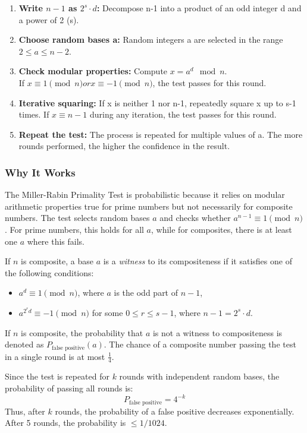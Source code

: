 \documentclass[12pt]{report}
\begin{document}
\begin{enumerate}
    \item \textbf{Write $n-1$ as $2^s \cdot d$:} Decompose n-1 into a product of an odd integer d and a power of 2 (s).
    \item \textbf{Choose random bases a:} Random integers a are selected in the range $2 \leq a \leq n-2$.
    \item \textbf{Check modular properties:} Compute $x = a^d \mod n$. \\ If $x \equiv 1 \pmod{n} or x \equiv -1 \pmod{n}$, the test passes for this round.
    \item \textbf{Iterative squaring:} If x is neither 1 nor n-1, repeatedly square x up to s-1 times. If $x \equiv n-1$ during any iteration, the test passes for this round.
    \item \textbf{Repeat the test:} The process is repeated for multiple values of a. The more rounds performed, the higher the confidence in the result.
\end{enumerate}

\subsubsection{Why It Works}

    The Miller-Rabin Primality Test is probabilistic because it relies on modular arithmetic properties true for prime numbers but not necessarily for composite numbers. The test selects random bases $a$ and checks whether $a^{n-1} \equiv 1 \pmod{n}$. For prime numbers, this holds for all $a$, while for composites, there is at least one $a$ where this fails.

    If $n$ is composite, a base $a$ is a \textit{witness} to its compositeness if it satisfies one of the following conditions: 
\begin{itemize}
    \item $a^d \equiv 1 \pmod{n}$, where $a$ is the odd part of $n-1$,
    \item $a^{2^r d} \equiv -1 \pmod{n}$ for some $0 \leq r \leq s-1$, where $n-1 = 2^s \cdot d$.
\end{itemize}

    If $n$ is composite, the probability that $a$ is not a witness to compositeness is denoted as $P_{\text{false positive}}(a)$. The chance of a composite number passing the test in a single round is at most $\frac{1}{4}$. 

    Since the test is repeated for $k$ rounds with independent random bases, the probability of passing all rounds is:
\[
P_{\text{false positive}} = 4^{-k}
\]
Thus, after $k$ rounds, the probability of a false positive decreases exponentially. After 5 rounds, the probability is $\leq 1/1024$.
\end{document}
